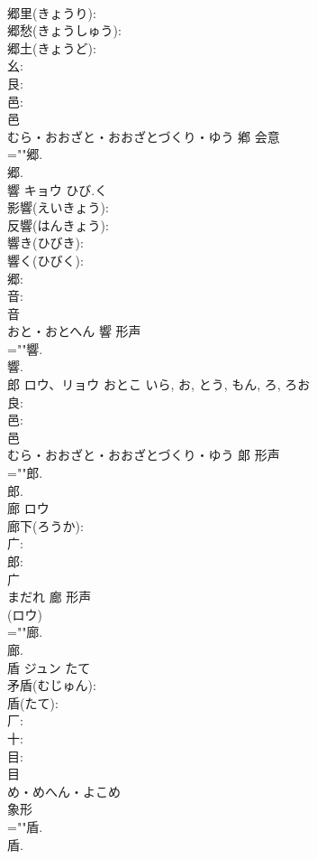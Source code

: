 \documentclass[8pt]{extreport}
\begin{document}
\begin{CJK}{UTF8}{min}
\\	郷里(きょうり): 
\\	郷愁(きょうしゅう): 
\\	郷土(きょうど): 
\\	幺: 
\\	艮: 
\\	邑: 
\\	邑	
\\	むら・おおざと・おおざとづくり・ゆう	鄕	会意 
\\	=""郷.
\\	郷.
\\	響	キョウ	ひび.く		
\\	影響(えいきょう): 
\\	反響(はんきょう): 
\\	響き(ひびき): 
\\	響く(ひびく): 
\\	郷: 
\\	音: 
\\	音	
\\	おと・おとへん	響	形声 
\\	=""響.
\\	響.
\\	郎	ロウ、リョウ	おとこ	いら, お, とう, もん, ろ, ろお	
\\	良: 
\\	邑: 
\\	邑	
\\	むら・おおざと・おおざとづくり・ゆう	郞	形声 
\\	=""郎.
\\	郎.
\\	廊	ロウ			
\\	廊下(ろうか): 
\\	广: 
\\	郎: 
\\	广	
\\	まだれ	廊	形声 
\\	(ロウ) 
\\	=""廊.
\\	廊.
\\	盾	ジュン	たて		
\\	矛盾(むじゅん): 
\\	盾(たて): 
\\	厂: 
\\	十: 
\\	目: 
\\	目	
\\	め・めへん・よこめ	
\\	象形 
\\	=""盾.
\\	盾.

\end{CJK}
\end{document}
